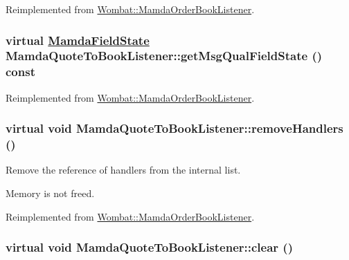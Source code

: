 Reimplemented from \hyperlink{classWombat_1_1MamdaOrderBookListener_881995554b016618dc16f9a9e15be90d}{Wombat::Mamda\-Order\-Book\-Listener}.\hypertarget{classMamdaQuoteToBookListener_62ad9b9cfc10f553c2b39cd54610ff8c}{
\subsubsection[getMsgQualFieldState]{\setlength{\rightskip}{0pt plus 5cm}virtual \hyperlink{namespaceWombat_93aac974f2ab713554fd12a1fa3b7d2a}{Mamda\-Field\-State} Mamda\-Quote\-To\-Book\-Listener::get\-Msg\-Qual\-Field\-State () const}}
\label{classMamdaQuoteToBookListener_62ad9b9cfc10f553c2b39cd54610ff8c}




Reimplemented from \hyperlink{classWombat_1_1MamdaOrderBookListener_0516e60cecd086e30781592f16110196}{Wombat::Mamda\-Order\-Book\-Listener}.\hypertarget{classMamdaQuoteToBookListener_41f6149d1c5e0dd70d57998fcd81feb2}{
\subsubsection[removeHandlers]{\setlength{\rightskip}{0pt plus 5cm}virtual void Mamda\-Quote\-To\-Book\-Listener::remove\-Handlers ()}}
\label{classMamdaQuoteToBookListener_41f6149d1c5e0dd70d57998fcd81feb2}


Remove the reference of handlers from the internal list. 

Memory is not freed. 

Reimplemented from \hyperlink{classWombat_1_1MamdaOrderBookListener_ba3e661b148450a0865b07cf169a12b1}{Wombat::Mamda\-Order\-Book\-Listener}.\hypertarget{classMamdaQuoteToBookListener_5d9ebf5190378ca7181473811c4d20c7}{
\subsubsection[clear]{\setlength{\rightskip}{0pt plus 5cm}virtual void Mamda\-Quote\-To\-Book\-Listener::clear ()}}
\label{classMamdaQuoteToBookListener_5d9ebf5190378ca7181473811c4d20c7}


